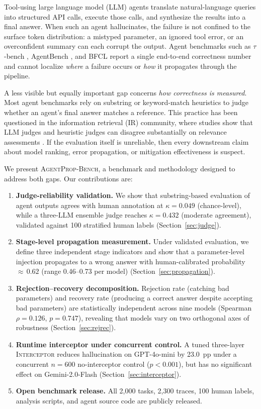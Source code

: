 \documentclass[11pt]{article}
\newcommand{\bench}{\textsc{AgentProp-Bench}\xspace}
\newcommand{\interceptor}{\textsc{Interceptor}\xspace}
\begin{document}
Tool-using large language model (LLM) agents translate natural-language
queries into structured API calls, execute those calls, and synthesize
the results into a final answer.
When such an agent hallucinates, the failure is not confined to the
surface token distribution: a mistyped parameter, an ignored tool error,
or an overconfident summary can each corrupt the output.
Agent benchmarks such as $\tau$-bench \citep{yao2024tau},
AgentBench \citep{liu2024agentbench}, and BFCL \citep{yan2025bfcl}
report a single end-to-end correctness number and cannot localize
\emph{where} a failure occurs or \emph{how} it propagates through the
pipeline.

A less visible but equally important gap concerns \emph{how correctness
is measured}.
Most agent benchmarks rely on substring or keyword-match heuristics to
judge whether an agent's final answer matches a reference.
This practice has been questioned in the information retrieval (IR)
community, where studies show that LLM judges and heuristic judges can
disagree substantially on relevance assessments
\citep{soboroff2024dont,thomas2024searcher,alaofi2024fooled}.
If the evaluation itself is unreliable, then every downstream claim about
model ranking, error propagation, or mitigation effectiveness is suspect.

We present \bench{}, a benchmark and methodology designed to address
both gaps.
Our contributions are:
\begin{enumerate}
  \item \textbf{Judge-reliability validation.}
    We show that substring-based evaluation of agent outputs agrees with
    human annotation at $\kappa{=}0.049$ (chance-level), while a
    three-LLM ensemble judge reaches $\kappa{=}0.432$ (moderate
    agreement), validated against 100 stratified human labels
    (Section~\ref{sec:judge}).
  \item \textbf{Stage-level propagation measurement.}
    Under validated evaluation, we define three independent stage
    indicators and show that a parameter-level injection propagates to a
    wrong answer with human-calibrated probability ${\approx}\,0.62$
    (range 0.46--0.73 per model) (Section~\ref{sec:propagation}).
  \item \textbf{Rejection--recovery decomposition.}
    Rejection rate (catching bad parameters) and recovery rate (producing
    a correct answer despite accepting bad parameters) are statistically
    independent across nine models (Spearman $\rho{=}0.126$,
    $p{=}0.747$), revealing that models vary on two orthogonal axes of
    robustness (Section~\ref{sec:rejrec}).
  \item \textbf{Runtime interceptor under concurrent control.}
    A tuned three-layer \interceptor{} reduces hallucination on
    GPT-4o-mini by 23.0~pp under a concurrent $n{=}600$ no-interceptor
    control ($p < 0.001$), but has no significant effect on
    Gemini-2.0-Flash (Section~\ref{sec:interceptor}).
  \item \textbf{Open benchmark release.}
    All 2{,}000 tasks, 2{,}300 traces, 100 human labels, analysis
    scripts, and agent source code are publicly released.
\end{enumerate}
\end{document}
